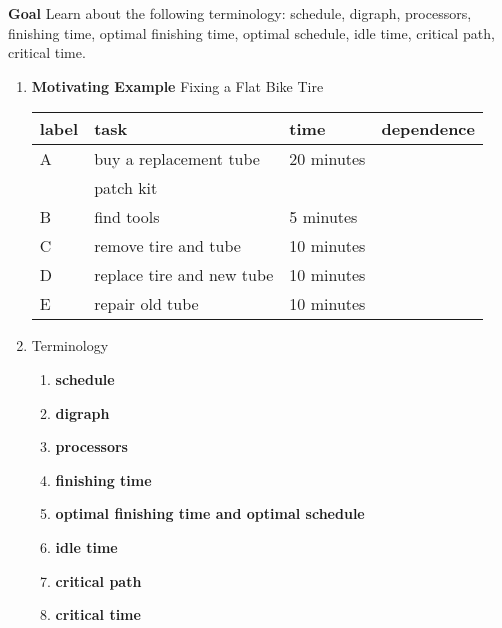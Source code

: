 \documentclass[12pt]{article}
\begin{document}
\textbf{Goal} Learn about the following terminology: schedule, digraph, processors, finishing time, optimal finishing time, optimal schedule, idle time, critical path, critical time.\\

\begin{enumerate}
\item \textbf{Motivating Example} Fixing a Flat Bike Tire\\

\begin{tabular}{llll}
label&task&time&dependence\\
\hline
A&buy a replacement tube&20 minutes&\\
&patch kit&&\\
B&find tools&5 minutes&\\
C&remove tire and tube&10 minutes&\\
D&replace tire and new tube&10 minutes&\\
E&repair old tube&10 minutes&\\
\end{tabular}
\vfill
{}
\vspace{.3in}

\newpage
\item Terminology
	\begin{enumerate}
	\item \textbf{schedule}
	\vfill
	\item \textbf{digraph}
	\vfill
	\item \textbf{processors}
	\vfill
	\item \textbf{finishing time}
	\vfill
	\item \textbf{optimal finishing time and optimal schedule}
	\vfill
	\item \textbf{idle time}
	\vfill
	\item \textbf{critical path}
	\vfill
	\item \textbf{critical time}
	\vfill
	\end{enumerate}


\end{enumerate}
\end{document}
